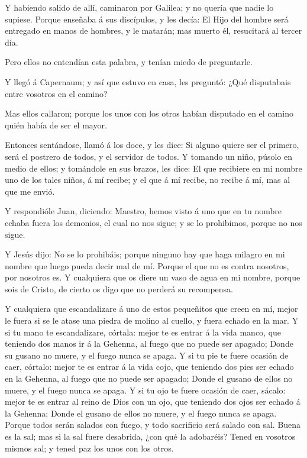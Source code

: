  Y habiendo salido de allí, caminaron por Galilea; y no
quería que nadie lo supiese.  Porque enseñaba á sus
discípulos, y les decía: El Hijo del hombre será entregado en manos de
hombres, y le matarán; mas muerto él, resucitará al tercer día.

 Pero ellos no entendían esta palabra, y tenían miedo de
preguntarle.

 Y llegó á Capernaum; y así que estuvo en casa, les
preguntó: ¿Qué disputabais entre vosotros en el camino?

 Mas ellos callaron; porque los unos con los otros habían
disputado en el camino quién había de ser el mayor.

 Entonces sentándose, llamó á los doce, y les dice: Si
alguno quiere ser el primero, será el postrero de todos, y el servidor
de todos.  Y tomando un niño, púsolo en medio de ellos; y
tomándole en sus brazos, les dice:  El que recibiere en mi
nombre uno de los tales niños, á mí recibe; y el que á mí recibe, no
recibe á mí, mas al que me envió.

 Y respondióle Juan, diciendo: Maestro, hemos visto á uno
que en tu nombre echaba fuera los demonios, el cual no nos sigue; y se
lo prohibimos, porque no nos sigue.

 Y Jesús dijo: No se lo prohibáis; porque ninguno hay que
haga milagro en mi nombre que luego pueda decir mal de mí. 
Porque el que no es contra nosotros, por nosotros es.  Y
cualquiera que os diere un vaso de agua en mi nombre, porque sois de
Cristo, de cierto os digo que no perderá su recompensa.

 Y cualquiera que escandalizare á uno de estos pequeñitos
que creen en mí, mejor le fuera si se le atase una piedra de molino al
cuello, y fuera echado en la mar.  Y si tu mano te
escandalizare, córtala: mejor te es entrar á la vida manco, que teniendo
dos manos ir á la Gehenna, al fuego que no puede ser apagado;
 Donde su gusano no muere, y el fuego nunca se apaga.
 Y si tu pie te fuere ocasión de caer, córtalo: mejor te es
entrar á la vida cojo, que teniendo dos pies ser echado en la Gehenna,
al fuego que no puede ser apagado;  Donde el gusano de
ellos no muere, y el fuego nunca se apaga.  Y si tu ojo te
fuere ocasión de caer, sácalo: mejor te es entrar al reino de Dios con
un ojo, que teniendo dos ojos ser echado á la Gehenna; 
Donde el gusano de ellos no muere, y el fuego nunca se apaga.
 Porque todos serán salados con fuego, y todo sacrificio
será salado con sal.  Buena es la sal; mas si la sal fuere
desabrida, ¿con qué la adobaréis? Tened en vosotros mismos sal; y tened
paz los unos con los otros.

